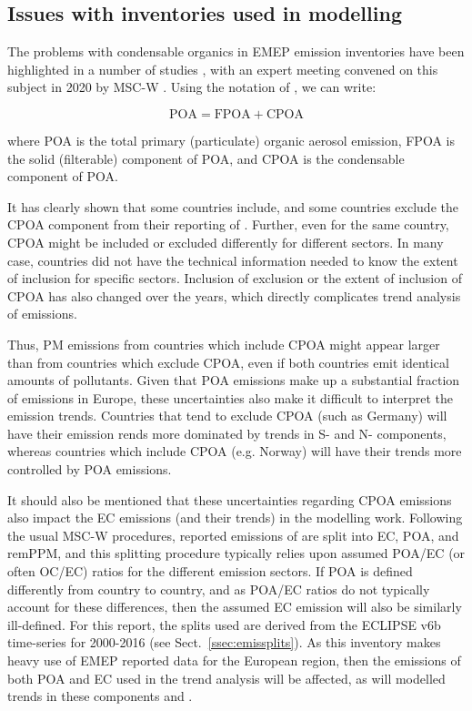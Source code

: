 \subsection{Issues with inventories used in modelling}


The problems with condensable organics in EMEP emission
inventories have been highlighted in a number of studies
\citep{DeniervanderGon2015,R2015:SVOC,TFMM2018,R2019:SVOC,R2020:CAMSREF2,R2020:SVOC},
with an expert meeting convened on this subject in 2020 by MSC-W
\citep{CONDws2020}. Using the notation of \citep{CONDws2020}, we can
write:


\begin{equation}
  \mbox{POA} = \mbox{FPOA} + \mbox{CPOA}
\end{equation}

where POA is the total primary (particulate) organic aerosol emission, FPOA
is the solid (filterable)  component of POA, and CPOA is the condensable
component of POA.

It has clearly shown that some countries include, and some countries
exclude the CPOA component from their reporting of \pmfine. Further, even
for the same country, CPOA might be included or excluded differently for
different sectors. In many case, countries did not have the technical
information needed to know the extent of inclusion for specific
sectors. Inclusion of exclusion or the extent of inclusion of CPOA has
also changed over the years, which directly complicates trend analysis
of emissions. 

Thus, PM emissions from countries which include CPOA might appear
larger than from countries which exclude CPOA, even if both countries
emit identical amounts of pollutants. Given that POA emissions make up a
substantial fraction of \pmfine emissions in Europe, these uncertainties
also make it difficult to interpret the emission trends. Countries that
tend to exclude CPOA (such as Germany) will have their \pmfine emission
rends more dominated by trends in S- and N- components, whereas countries
which include CPOA (e.g. Norway) will have their trends more controlled
by POA emissions.


It should also be mentioned that these uncertainties regarding CPOA
emissions also impact the EC emissions (and their trends) in the
modelling work. Following the usual MSC-W procedures, reported emissions
of \pmfine are split into EC, POA, and remPPM, and this splitting
procedure typically relies upon assumed POA/EC (or often OC/EC) ratios for the different
emission sectors. If POA is defined differently from country to country,
and as POA/EC ratios do not typically account for these differences,
then the assumed EC emission will also be similarly ill-defined. For this report, the
splits used are derived from the ECLIPSE v6b time-series for 2000-2016
(see Sect.~\ref{ssec:emissplits}). As this inventory makes heavy use of
EMEP reported data for the European region, then the emissions of both POA and EC used in the trend analysis will be affected, as will modelled trends in these components and \pmfine.


